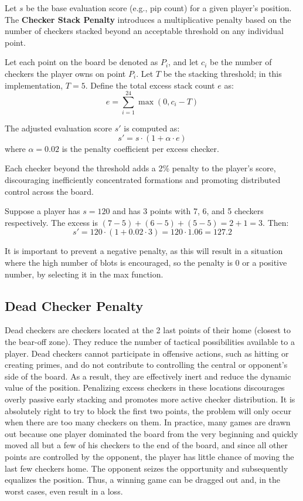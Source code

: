  Let $s$ be the base evaluation score (e.g., pip count) for a given player's position. The \textbf{Checker Stack Penalty} introduces a multiplicative penalty based on the number of checkers stacked beyond an acceptable threshold on any individual point.

Let each point on the board be denoted as $P_i$, and let $c_i$ be the number of checkers the player owns on point $P_i$. Let $T$ be the stacking threshold; in this implementation, $T = 5$. Define the total excess stack count $e$ as:
\[
e = \sum_{i=1}^{24} \max(0, c_i - T)
\]

The adjusted evaluation score $s'$ is computed as:
\[
s' = s \cdot (1 + \alpha \cdot e)
\]
where $\alpha = 0.02$ is the penalty coefficient per excess checker.

 Each checker beyond the threshold adds a 2\% penalty to the player's score, discouraging inefficiently concentrated formations and promoting distributed control across the board.

 Suppose a player has $s = 120$ and has 3 points with 7, 6, and 5 checkers respectively. The excess is $(7 - 5) + (6 - 5) + (5 - 5) = 2 + 1 = 3$. Then:
\[
s' = 120 \cdot (1 + 0.02 \cdot 3) = 120 \cdot 1.06 = 127.2
\]

It is important to prevent a negative penalty, as this will result in a situation where the high number of blots is encouraged, so the penalty is 0 or a positive number, by selecting it in the max function.

\subsection*{Dead Checker Penalty}
Dead checkers are checkers located at the 2 last points of their home (closest to the bear-off zone). They reduce the number of tactical possibilities available to
a player. Dead checkers cannot participate in offensive actions, such as hitting or creating primes,
and do not contribute to controlling the central or opponent’s side of the board. As a
result, they are effectively inert and reduce the dynamic value of the position. Penalizing
excess checkers in these locations discourages overly passive early stacking and promotes
more active checker distribution. It is absolutely right to try to block the first two points, the problem will only occur when there are too many checkers on them. 
In practice, many games are drawn out because one player dominated the board from the very beginning and quickly moved all but a few of his checkers to the end of the board, and since all other points are controlled by the opponent, the player has little chance of moving the last few checkers home. The opponent seizes the opportunity and subsequently equalizes the position. Thus, a winning game can be dragged out and, in the worst cases, even result in a loss.

